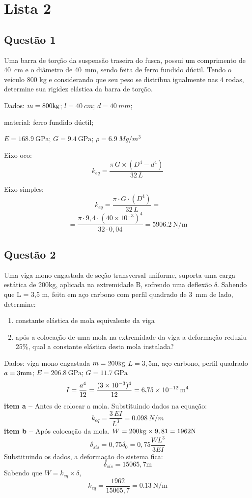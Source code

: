 \section{Lista 2}
\subsection{Questão 1}
Uma barra de torção da suspensão traseira do fusca, possui um comprimento de \SI{40}{cm} e o
diâmetro de \SI{40}{mm}, sendo feita de ferro fundido dúctil. Tendo o veículo 800 kg e considerando que seu peso
se distribua igualmente nas 4 rodas, determine sua rigidez elástica da barra de torção.

\resol
Dados: $m=800\kg$; $l = \SI{40}{cm}$; $d = \SI{40}{mm}$;

material: ferro fundido dúctil;

$ E=\SI{168,9}{\giga\pascal}$; $G =\SI{9,4}{\giga\pascal}$;
$ \rho =\SI{6,9}{Mg\per{m^3}} $

Eixo oco:
\[ k_{eq} = \frac{\pi\, G\times (D^4-d^4)}{32\,L} \]

Eixo simples:
\[
    k_{eq} = \frac{\pi\cdot G\cdot (D^4)}{32\,L}=
\]
\[
=\frac{\pi\cdot 9,4 \cdot (40\times 10^{-3})^{4} }{32\cdot
0,04}=\SI{5906,2}{\newton\per\meter}
\]
\subsection{Questão 2}
Uma viga mono engastada de seção transversal uniforme, suporta uma carga estática de 200kg,
aplicada na extremidade B, sofrendo uma deflexão $\delta$. Sabendo que L = 3,5 m, feita em aço carbono com
perfil quadrado de \SI{3}{mm} de lado, determine:
\begin{enumerate}[label=\alph*)]
    \item constante elástica de mola equivalente da viga
    \item após a colocação de uma mola na extremidade da viga a deformação
        reduziu 25\%, qual a constante elástica desta mola instalada?
\end{enumerate}

\resol

Dados: viga mono engastada $m=200 \kg$ $L=3,5 \mathrm{m}$, aço carbono, perfil quadrado $a=3 \mm$;
$E=\SI{206,8}{\giga\pascal}$;  $G=\SI{11,7}{\giga\pascal}$
\[
    I=\frac{a^4}{12} = \frac{(3\times 10^{-3})^4}{12}=\SI{6,75d-12}{m^4}
\]
\textbf{item a --} Antes de colocar a mola.
Substituindo dados na equação:
\[
k_{eq}=\frac{3\, E I}{L^3}=\SI{0,098}{N /m}
\]
\textbf{item b --} Após colocação da mola.
$W=200\kg \times 9,81 = 1962\mathrm{N}$
\[
    \delta_{sis}=0,75\delta_{0}=0,75 \frac{W L^3}{3E I}
\]
Substituindo os dados, a deformação do sistema fica:
\[
    \delta_{sis}=15065,7\mathrm{m}
\]
Sabendo que $W=k_{eq}\times \delta$,
\[
    k_{eq}=\frac{1962}{15065,7}=\SI{0,13}{\newton\per\meter}
\]

